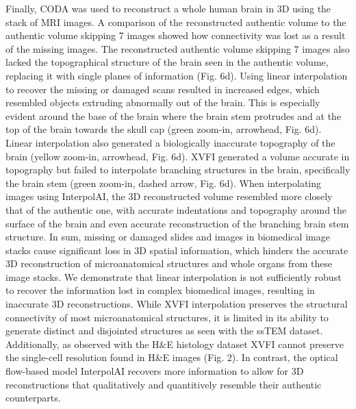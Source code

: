 \begin{refsection}
    Finally, CODA was used to reconstruct a whole human brain in 3D using the stack of MRI images. A comparison of the reconstructed authentic volume to the authentic volume skipping 7 images showed how connectivity was lost as a result of the missing images. The reconstructed authentic volume skipping 7 images also lacked the topographical structure of the brain seen in the authentic volume, replacing it with single planes of information (Fig. 6d). Using linear interpolation to recover the missing or damaged scans resulted in increased edges, which resembled objects extruding abnormally out of the brain. This is especially evident around the base of the brain where the brain stem protrudes and at the top of the brain towards the skull cap (green zoom-in, arrowhead, Fig. 6d). Linear interpolation also generated a biologically inaccurate topography of the brain (yellow zoom-in, arrowhead, Fig. 6d). XVFI generated a volume accurate in topography but failed to interpolate branching structures in the brain, specifically the brain stem (green zoom-in, dashed arrow, Fig. 6d). When interpolating images using InterpolAI, the 3D reconstructed volume resembled more closely that of the authentic one, with accurate indentations and topography around the surface of the brain and even accurate reconstruction of the branching brain stem structure. 
    In sum, missing or damaged slides and images in biomedical image stacks cause significant loss in 3D spatial information, which hinders the accurate 3D reconstruction of microanatomical structures and whole organs from these image stacks. We demonstrate that linear interpolation is not sufficiently robust to recover the information lost in complex biomedical images, resulting in inaccurate 3D reconstructions. While XVFI interpolation preserves the structural connectivity of most microanatomical structures, it is limited in its ability to generate distinct and disjointed structures as seen with the ssTEM dataset. Additionally, as observed with the H&E histology dataset XVFI cannot preserve the single-cell resolution found in H&E images (Fig. 2). In contrast, the optical flow-based model InterpolAI recovers more information to allow for 3D reconstructions that qualitatively and quantitively resemble their authentic counterparts.
    

\end{refsection}
